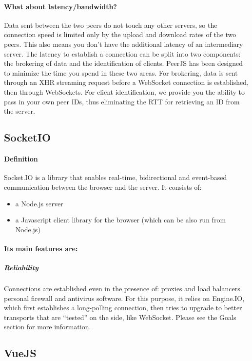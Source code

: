 \documentclass{article}
\begin{document}
    \paragraph{What about latency/bandwidth?}
    Data sent between the two peers do not touch any other servers, so the connection speed is limited only by the upload and download rates of the two peers. This also means you don't have the additional latency of an intermediary server.
    \newline
    The latency to establish a connection can be split into two components: the brokering of data and the identification of clients. PeerJS has been designed to minimize the time you spend in these two areas. For brokering, data is sent through an XHR streaming request before a WebSocket connection is established, then through WebSockets. For client identification, we provide you the ability to pass in your own peer IDs, thus eliminating the RTT for retrieving an ID from the server.

\subsection{SocketIO}
\paragraph{Definition} 
Socket.IO is a library that enables real-time, bidirectional and event-based communication between the browser and the server. It consists of:

\begin{itemize}
	\item a Node.js server
	\item a Javascript client library for the browser (which can be also run from Node.js)
\end{itemize}

\paragraph{Its main features are:}
\subparagraph{Reliability}
Connections are established even in the presence of:
proxies and load balancers.
personal firewall and antivirus software.
For this purpose, it relies on Engine.IO, which first establishes a long-polling connection, then tries to upgrade to better transports that are “tested” on the side, like WebSocket. Please see the Goals section for more information.

\subsection{VueJS}
\end{document}
